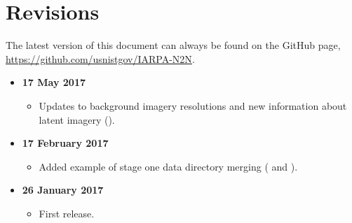 \section*{Revisions}
\label{sec:revisions}
The latest version of this document can always be found on the GitHub page, \url{https://github.com/usnistgov/IARPA-N2N}.

\begin{itemize}
	\item \textbf{17 May 2017}
	\begin{itemize}
		\item Updates to background imagery resolutions and new
		      information about latent imagery
		      ().
	\end{itemize}
	\item \textbf{17 February 2017}
	\begin{itemize}
		\item Added example of stage one data directory merging
		( and
		).
	\end{itemize}
	\item \textbf{26 January 2017}
	\begin{itemize}
		\item First release.
	\end{itemize}
\end{itemize}

